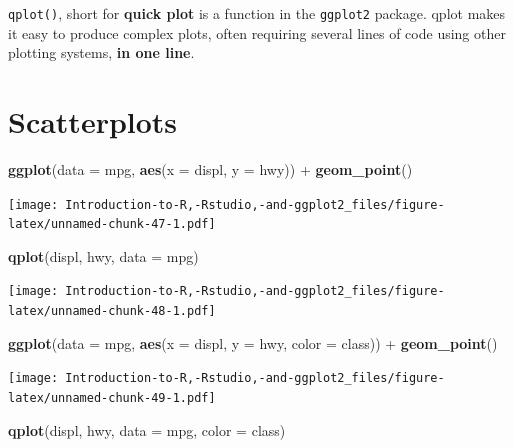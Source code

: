 \documentclass[]{book}
\newenvironment{Shaded}{\begin{snugshade}}{\end{snugshade}}
\newcommand{\KeywordTok}[1]{\textcolor[rgb]{0.13,0.29,0.53}{\textbf{{#1}}}}
\newcommand{\DataTypeTok}[1]{\textcolor[rgb]{0.13,0.29,0.53}{{#1}}}
\newcommand{\StringTok}[1]{\textcolor[rgb]{0.31,0.60,0.02}{{#1}}}
\newcommand{\NormalTok}[1]{{#1}}
\begin{document}
\texttt{qplot()}, short for \textbf{quick plot} is a function in the
\texttt{ggplot2} package. qplot makes it easy to produce complex plots,
often requiring several lines of code using other plotting systems,
\textbf{in one line}.

\section{Scatterplots}\label{scatterplots}

\begin{Shaded}
\begin{Highlighting}[]
\KeywordTok{ggplot}\NormalTok{(}\DataTypeTok{data =} \NormalTok{mpg, }\KeywordTok{aes}\NormalTok{(}\DataTypeTok{x =} \NormalTok{displ, }\DataTypeTok{y =} \NormalTok{hwy)) +}\StringTok{ }\KeywordTok{geom_point}\NormalTok{()}
\end{Highlighting}
\end{Shaded}

\texttt{[image: Introduction-to-R,-Rstudio,-and-ggplot2\_files/figure-latex/unnamed-chunk-47-1.pdf]}

\begin{Shaded}
\begin{Highlighting}[]
\KeywordTok{qplot}\NormalTok{(displ, hwy, }\DataTypeTok{data =} \NormalTok{mpg)}
\end{Highlighting}
\end{Shaded}

\texttt{[image: Introduction-to-R,-Rstudio,-and-ggplot2\_files/figure-latex/unnamed-chunk-48-1.pdf]}

\begin{Shaded}
\begin{Highlighting}[]
\KeywordTok{ggplot}\NormalTok{(}\DataTypeTok{data =} \NormalTok{mpg, }\KeywordTok{aes}\NormalTok{(}\DataTypeTok{x =} \NormalTok{displ, }\DataTypeTok{y =} \NormalTok{hwy, }\DataTypeTok{color =} \NormalTok{class)) +}\StringTok{ }\KeywordTok{geom_point}\NormalTok{()}
\end{Highlighting}
\end{Shaded}

\texttt{[image: Introduction-to-R,-Rstudio,-and-ggplot2\_files/figure-latex/unnamed-chunk-49-1.pdf]}

\begin{Shaded}
\begin{Highlighting}[]
\KeywordTok{qplot}\NormalTok{(displ, hwy, }\DataTypeTok{data =} \NormalTok{mpg, }\DataTypeTok{color =} \NormalTok{class)}
\end{Highlighting}
\end{Shaded}
\end{document}
